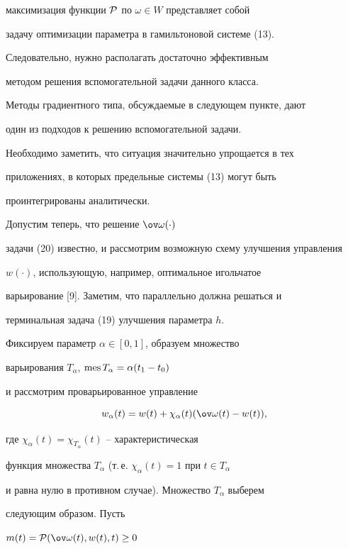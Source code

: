 максимизация функции $\cal P$ по $\omega \in W$ представляет собой


задачу оптимизации параметра в гамильтоновой системе (13).


Следовательно, нужно располагать достаточно эффективным


методом решения вспомогательной задачи данного класса. 


Методы градиентного типа, обсуждаемые в следующем пункте, дают


один из подходов к решению вспомогательной задачи. 


Необходимо заметить, что ситуация значительно упрощается в тех 


приложениях, в которых предельные системы (13) могут быть


проинтегрированы аналитически.





Допустим теперь, что решение $\ov \omega(\cdot)$


задачи (20) известно, и рассмотрим возможную схему улучшения управления


$w(\cdot)$, использующую, например, оптимальное игольчатое 


варьирование [9]. Заметим, что параллельно должна решаться и 


терминальная задача (19) улучшения параметра $h$.





Фиксируем параметр $\alpha \in [0,1]$, образуем множество 


варьирования $T_\alpha$, $\operatorname{mes} T_\alpha = \alpha(t_1-t_0)$


и рассмотрим проварьированное управление


\begin{equation}


w_\alpha (t)=w(t) + \chi_\alpha (t) (\ov \omega(t)-w(t)),


\end{equation}


где $\chi_\alpha (t)=\chi_{T_\alpha}(t)$ -- характеристическая 


функция множества $T_\alpha$ (т.\,е. $\chi_\alpha (t)=1$ при $t\in T_\alpha$


и равна нулю в противном случае). Множество $T_\alpha$ выберем 


следующим образом. Пусть


$m(t)={\cal P} (\ov \omega (t), w(t),t) \ge 0$



